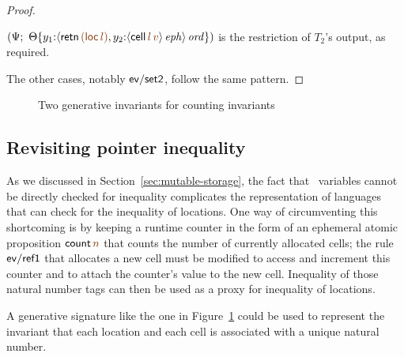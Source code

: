 \begin{proof}
\begin{description}
$\left(\Psi; ~
   \tackon{\Theta}{y_1{:}\istrue{\susp{{\sf retn}\,\lf{({\sf loc}\,\lf{l})},
                   y_2{:}\iseph{\susp{{\sf cell}\,\lf{l}\,\lf{v}}}}}}
   \right)$ is the restriction of $T_2$'s output, as
required.






\end{description}
The other cases, notably ${\sf ev/set2}$, follow the 
same pattern.
\end{proof}


\begin{figure}
\caption{Two generative invariants for counting invariants}
\label{fig:gen-countstate}
\end{figure}
\subsection{Revisiting pointer inequality}
\label{sec:pointer-inequality}

As we discussed in Section~\ref{sec:mutable-storage}, the fact that
\sls~variables cannot be directly checked for inequality complicates
the representation of languages that can check for the inequality of
locations. One way of circumventing this shortcoming is by keeping a
runtime counter in the form of an ephemeral atomic proposition ${\sf
  count}\,\lf{n}$ that counts the number of currently allocated cells;
the rule ${\sf ev/ref1}$ that allocates a new cell must be modified
to access and increment this counter and to attach the counter's value
to the new cell. Inequality of those natural number tags can then be
used as a proxy for inequality of locations.

A generative signature like the one in Figure~\ref{fig:gen-countstate}
could be used to represent the invariant that each location and each
cell is associated with a unique natural number.


